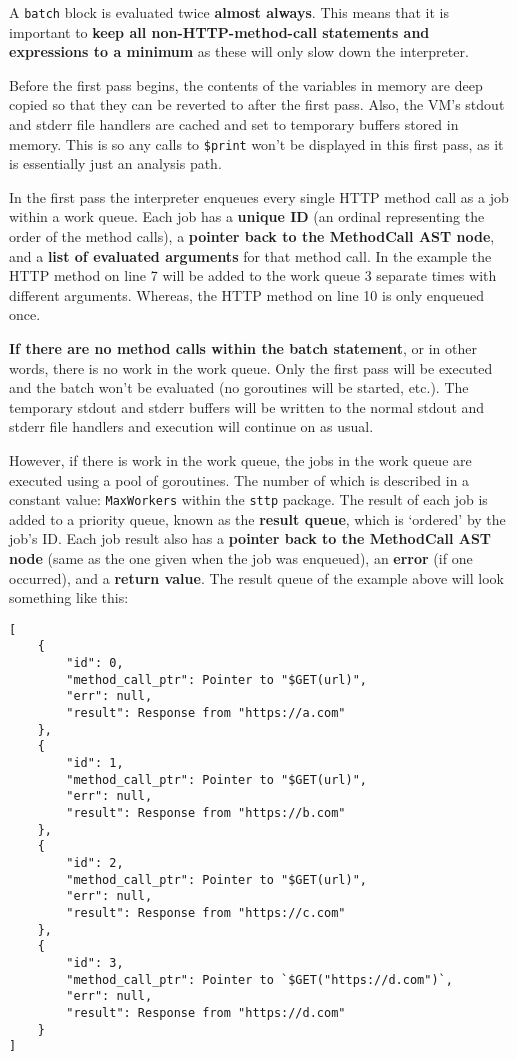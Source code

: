 A \verb|batch| block is evaluated twice \textbf{almost always}. This means that it is important to \textbf{keep all non-HTTP-method-call statements and expressions to a minimum} as these will only slow down the interpreter.

Before the first pass begins, the contents of the variables in memory are deep copied so that they can be reverted to after the first pass. Also, the VM's stdout and stderr file handlers are cached and set to temporary buffers stored in memory. This is so any calls to \verb|$print| won't be displayed in this first pass, as it is essentially just an analysis path.

In the first pass the interpreter enqueues every single HTTP method call as a job within a work queue. Each job has a \textbf{unique ID} (an ordinal representing the order of the method calls), a \textbf{pointer back to the MethodCall AST node}, and a \textbf{list of evaluated arguments} for that method call. In the example the HTTP method on line 7 will be added to the work queue 3 separate times with different arguments. Whereas, the HTTP method on line 10 is only enqueued once.

\textbf{If there are no method calls within the batch statement}, or in other words, there is no work in the work queue. Only the first pass will be executed and the batch won't be evaluated (no goroutines will be started, etc.). The temporary stdout and stderr buffers will be written to the normal stdout and stderr file handlers and execution will continue on as usual.

However, if there is work in the work queue, the jobs in the work queue are executed using a pool of goroutines. The number of which is described in a constant value: \verb|MaxWorkers| within the \verb|sttp| package. The result of each job is added to a priority queue, known as the \textbf{result queue}, which is `ordered' by the job's ID. Each job result also has a \textbf{pointer back to the MethodCall AST node} (same as the one given when the job was enqueued), an \textbf{error} (if one occurred), and a \textbf{return value}. The result queue of the example above will look something like this:

\begin{center}
    \begin{verbatim}
[
    {
        "id": 0,
        "method_call_ptr": Pointer to "$GET(url)",
        "err": null,
        "result": Response from "https://a.com"
    },
    {
        "id": 1,
        "method_call_ptr": Pointer to "$GET(url)",
        "err": null,
        "result": Response from "https://b.com"
    },
    {
        "id": 2,
        "method_call_ptr": Pointer to "$GET(url)",
        "err": null,
        "result": Response from "https://c.com"
    },
    {
        "id": 3,
        "method_call_ptr": Pointer to `$GET("https://d.com")`,
        "err": null,
        "result": Response from "https://d.com"
    }
]
    \end{verbatim}
\end{center}


